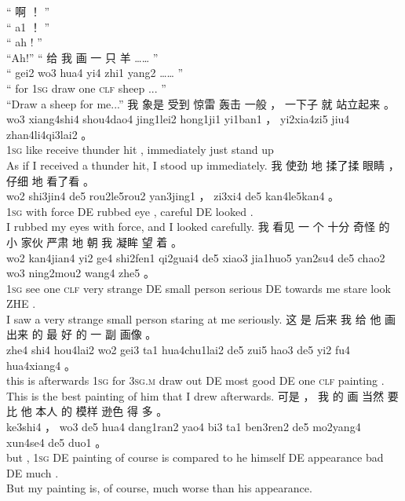 \documentclass[UTF8]{ctexart}
\begin{document}
\begin{exe}
\ex
\glll
“ 啊 ！ ”
\\
“ a1 ！ ”
\\
`` ah ! ''
\\
\trans ``Ah!''
\ex
\glll
“ 给 我 画 一 只 羊 …… ”
\\
“ gei2 wo3 hua4 yi4 zhi1 yang2 …… ”
\\
`` for \textsc{1sg} draw one \textsc{clf} sheep ... ''
\\
\trans ``Draw a sheep for me...''
\ex
\glll
我 象是 受到 惊雷 轰击 一般 ， 一下子 就 站立起来 。
\\
wo3 xiang4shi4 shou4dao4 jing1lei2 hong1ji1 yi1ban1 ， yi2xia4zi5 jiu4 zhan4li4qi3lai2 。
\\
\textsc{1sg} like receive thunder hit {} , immediately just {stand up}
\\
\trans As if I received a thunder hit, I stood up immediately. 
\ex
\glll
我 使劲 地 揉了揉 眼睛 ， 仔细 地 看了看 。
\\
wo2 shi3jin4 de5 rou2le5rou2 yan3jing1 ， zi3xi4 de5 kan4le5kan4 。
\\
\textsc{1sg} {with force} DE rubbed eye , careful DE looked .
\\
\trans I rubbed my eyes with force, and I looked carefully. 
\ex
\glll
我 看见 一 个 十分 奇怪 的 小 家伙 严肃 地 朝 我 凝眸 望 着 。
\\
wo2 kan4jian4 yi2 ge4 shi2fen1 qi2guai4 de5 xiao3 jia1huo5 yan2su4 de5 chao2 wo3 ning2mou2 wang4 zhe5 。
\\
\textsc{1sg} see one \textsc{clf} very strange DE small person serious DE towards me stare look ZHE .
\\
\trans I saw a very strange small person staring at me seriously.
\ex
\glll
这 是 后来 我 给 他 画出来 的 最 好 的 一 副 画像 。
\\
zhe4 shi4 hou4lai2 wo2 gei3 ta1 hua4chu1lai2 de5 zui5 hao3 de5 yi2 fu4 hua4xiang4 。
\\
this is afterwards \textsc{1sg} for \textsc{3sg.m} {draw out} DE most good DE one \textsc{clf} painting .
\\
\trans This is the best painting of him that I drew afterwards. 
\ex
\glll
可是 ， 我 的 画 当然 要 比 他 本人 的 模样 逊色 得 多 。
\\
ke3shi4 ， wo3 de5 hua4 dang1ran2 yao4 bi3 ta1 ben3ren2 de5 mo2yang4 xun4se4 de5 duo1 。
\\
but , \textsc{1sg} DE painting {of course} is {compared to} he himself DE appearance bad DE much .
\\
\trans But my painting is, of course, much worse than his appearance.

\end{exe}
\end{document}

